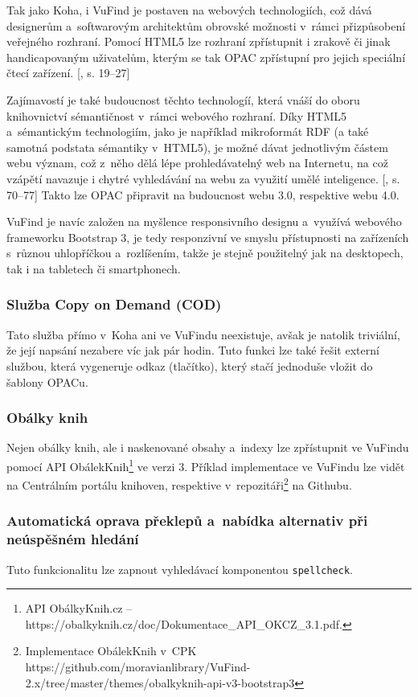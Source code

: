 \documentclass[
	11pt, oneside, printed, final, palatino
	microtype,
	table,   %
	lof,     %
	lot     %
]{fithesis3}
\newcommand{\citepages}[2]{[\cite{#2}, s. #1]}
\newcommand{\code}[1]{\texttt{#1}}
\begin{document}
{Tak jako Koha, i VuFind je postaven na webových technologiích, což dává designerům a~softwarovým architektům obrovské možnosti v~rámci přizpůsobení veřejného rozhraní. Pomocí HTML5 lze rozhraní zpřístupnit i zrakově či jinak handicapovaným uživatelům, kterým se tak OPAC zpřístupní pro jejich speciální čtecí zařízení. \citepages{19–27}{Hogan2011}

Zajímavostí je také budoucnost těchto technologíí, která vnáší do oboru knihovnictví sémantičnost v~rámci webového rozhraní. Díky HTML5 a~sémantickým technologiím, jako je například mikroformát RDF (a také samotná podstata sémantiky v~HTML5), je možné dávat jednotlivým částem webu význam, což z~něho dělá lépe prohledávatelný web na Internetu, na což vzápětí navazuje i chytré vyhledávání na webu za využití umělé inteligence. \citepages{70–77}{fay_sauers_2012} Takto lze OPAC připravit na budoucnost webu 3.0, respektive webu 4.0.

VuFind je navíc založen na myšlence responsivního designu a~využívá webového frameworku  Bootstrap 3, je tedy responzivní ve smyslu přístupnosti na zařízeních s~různou uhlopříčkou a~rozlíšením, takže je stejně použitelný jak na desktopech, tak i na tabletech či smartphonech.

\subsubsection{{\large Služba Copy on Demand (COD)}}
Tato služba přímo v~Koha ani ve VuFindu neexistuje, avšak je natolik triviální, že její napsání nezabere víc jak pár hodin. Tuto funkci lze také řešit externí službou, která vygeneruje odkaz (tlačítko), který stačí jednoduše vložit do šablony OPACu.


\subsubsection{{\large Obálky knih}}
Nejen obálky knih, ale i naskenované obsahy a~indexy lze zpřístupnit ve VuFindu pomocí API ObálekKnih\footnote{API ObálkyKnih.cz – https://obalkyknih.cz/doc/Dokumentace\_API\_OKCZ\_3.1.pdf.} ve verzi 3. Příklad implementace ve VuFindu lze vidět na Centrálním portálu knihoven, respektive v~repozitáři\footnote{Implementace ObálekKnih v~CPK https://github.com/moravianlibrary/VuFind-2.x/tree/master/themes/obalkyknih-api-v3-bootstrap3} na Githubu.

\subsubsection{{\large Automatická oprava překlepů a~nabídka alternativ při neúspěšném hledání}}
Tuto funkcionalitu lze zapnout vyhledávací komponentou \code{spellcheck}.

}
\end{document}

